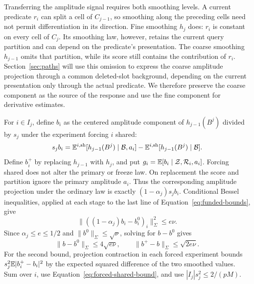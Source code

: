 Transferring the amplitude signal requires both smoothing levels.
A current predicate $r_i$ can split a cell of $C_{j-1}$, so smoothing
along the preceding cells need not permit differentiation in its
direction. Fine smoothing $h_j$ does: $r_i$ is constant on every cell
of $C_j$. Its smoothing law, however, retains the current query partition
and can depend on the predicate's presentation. The coarse smoothing
$h_{j-1}$ omits that partition, while its score still contains the
contribution of $r_i$. Section~\ref{sec:paths} will use this omission to
express the coarse amplitude projection through a common deleted-slot
background, depending on the current presentation only through the actual
predicate. We therefore preserve the coarse component as the source of
the response and use the fine component for derivative estimates.

For $i\in I_j$, define $b_i$ as the centered amplitude component of
$h_{j-1}(B^j)$ divided by $s_j$ under the experiment forcing $i$ shared:
\[
 s_jb_i=\mathbb E^{i,\rm sh}[h_{j-1}(B^j)\mid\mathcal B,a_i]
                 -\mathbb E^{i,\rm sh}[h_{j-1}(B^j)\mid\mathcal B].
\]
Define $b_i^+$ by replacing $h_{j-1}$ with $h_j$, and put
$g_i=\mathbb E[b_i\mid\mathcal Z,\mathcal R_i,a_i]$.
Forcing shared does not alter the primary or freeze law. On replacement
the score and partition ignore the primary amplitude $a_i$. Thus the
corresponding amplitude projection under the ordinary law is exactly
$(1-\alpha_j)s_jb_i$. Conditional Bessel inequalities, applied at each
stage to the last line of Equation~\ref{eq:funded-bounds}, give
\[
 \|((1-\alpha_j)b_i-b_i^0)_i\|_\Sigma^2\le e\nu.
\]
Since $\alpha_j\le e\le1/2$ and $\|b^0\|_\Sigma\le\sqrt\nu$,
solving for $b-b^0$ gives
\begin{equation}\label{eq:component-approximations}
 \|b-b^0\|_\Sigma\le4\sqrt{e\nu},\qquad
 \|b^+-b\|_\Sigma\le\sqrt{2e\nu}.
\end{equation}
For the second bound, projection contraction in each forced experiment
bounds $s_j^2\mathbb E|b_i^+-b_i|^2$ by the expected squared difference of
the two smoothed values. Sum over $i$, use
Equation~\ref{eq:forced-shared-bound}, and use
$|I_j|s_j^2\le2/(pM)$.

